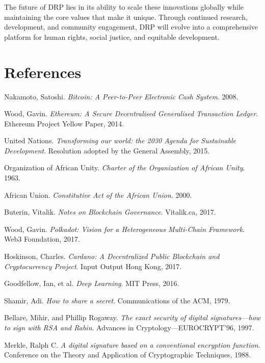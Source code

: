 \documentclass[11pt,a4paper]{article}
\begin{document}
The future of DRP lies in its ability to scale these innovations globally while maintaining the core values that make it unique. Through continued research, development, and community engagement, DRP will evolve into a comprehensive platform for human rights, social justice, and equitable development.


\section{References}

\begin{thebibliography}{99}

Nakamoto, Satoshi.
\textit{Bitcoin: A Peer-to-Peer Electronic Cash System}.
2008.

Wood, Gavin.
\textit{Ethereum: A Secure Decentralised Generalised Transaction Ledger}.
Ethereum Project Yellow Paper, 2014.

United Nations.
\textit{Transforming our world: the 2030 Agenda for Sustainable Development}.
Resolution adopted by the General Assembly, 2015.

Organization of African Unity.
\textit{Charter of the Organization of African Unity}.
1963.

African Union.
\textit{Constitutive Act of the African Union}.
2000.

Buterin, Vitalik.
\textit{Notes on Blockchain Governance}.
Vitalik.ca, 2017.

Wood, Gavin.
\textit{Polkadot: Vision for a Heterogeneous Multi-Chain Framework}.
Web3 Foundation, 2017.

Hoskinson, Charles.
\textit{Cardano: A Decentralized Public Blockchain and Cryptocurrency Project}.
Input Output Hong Kong, 2017.

Goodfellow, Ian, et al.
\textit{Deep Learning}.
MIT Press, 2016.

Shamir, Adi.
\textit{How to share a secret}.
Communications of the ACM, 1979.

Bellare, Mihir, and Phillip Rogaway.
\textit{The exact security of digital signatures—how to sign with RSA and Rabin}.
Advances in Cryptology—EUROCRYPT'96, 1997.

Merkle, Ralph C.
\textit{A digital signature based on a conventional encryption function}.
Conference on the Theory and Application of Cryptographic Techniques, 1988.

\end{thebibliography}
\end{document}
